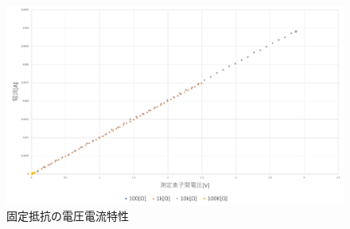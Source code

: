 \begin{figure}[h]
        \centering
        \includegraphics[scale=0.45]{./fig/3-1.pdf}
	\caption{固定抵抗の電圧電流特性}
	\label{fig:3-1}  
\end{figure}